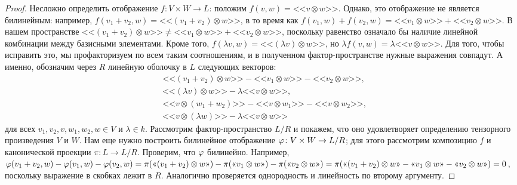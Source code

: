 \begin{proof}
Несложно определить отображение $f\colon V\times W\to L$: положим
$f(v,w) = \mbox{<<}v\otimes w\mbox{>>}$. Однако, это отображение не
является билинейным: например, $f(v_1+v_2,w) =
\mbox{<<}(v_1+v_2)\otimes w\mbox{>>}$, в то время как
$f(v_1,w) + f(v_2,w) = \mbox{<<}v_1\otimes w\mbox{>>} +
\mbox{<<}v_2\otimes w\mbox{>>}$.
В нашем пространстве $\mbox{<<}(v_1+v_2)\otimes w\mbox{>>}\neq
\mbox{<<}v_1\otimes w\mbox{>>} + 
\mbox{<<}v_2\otimes w\mbox{>>}$, поскольку равенство означало бы
наличие линейной комбинации между базисными элементами.
Кроме того,
$f(\lambda v,w) = \mbox{<<}(\lambda v)\otimes w\mbox{>>}$, но
$\lambda f(v,w) = \lambda\mbox{<<}v\otimes w\mbox{>>}$.
Для того, чтобы исправить это, мы профакторизуем по всем таким
соотношениям, и в полученном фактор-пространстве нужные выражения
совпадут.
А именно, обозначим через $R$ линейную оболочку в $L$ следующих векторов:
\begin{align*}
& \mbox{<<}(v_1+v_2)\otimes w\mbox{>>} - \mbox{<<}v_1\otimes w\mbox{>>} - 
\mbox{<<}v_2\otimes w\mbox{>>},\\
& \mbox{<<}(\lambda v)\otimes w\mbox{>>} - \lambda\mbox{<<}v\otimes w\mbox{>>},\\
& \mbox{<<}v\otimes (w_1+w_2)\mbox{>>} - \mbox{<<}v\otimes w_1\mbox{>>} -
\mbox{<<}v\otimes w_2\mbox{>>},\\
& \mbox{<<}v\otimes (\lambda w)\mbox{>>} - \lambda\mbox{<<}v\otimes w\mbox{>>}
\end{align*}
для всех $v_1,v_2,v,w_1,w_2,w\in V$ и $\lambda\in k$.
Рассмотрим фактор-пространство $L/R$ и покажем, что
оно удовлетворяет определению тензорного произведения $V$
и $W$. Нам еще нужно построить билинейное отображение
$\varphi\colon V\times W\to L/R$; для этого рассмотрим композицию $f$ и
канонической проекции $\pi\colon L\to L/R$. Проверим, что $\varphi$
билинейно. Например, $\varphi(v_1+v_2,w)-\varphi(v_1,w)-\varphi(v_2,w) = 
\pi(\mbox{<<}(v_1+v_2)\otimes w\mbox{>>}) -
\pi(\mbox{<<}v_1\otimes w\mbox{>>}) -
\pi(\mbox{<<}v_2\otimes w\mbox{>>})
= \pi(\mbox{<<}(v_1+v_2)\otimes w\mbox{>>}-
\mbox{<<}v_1\otimes w\mbox{>>} -
\mbox{<<}v_2\otimes w\mbox{>>}) = 0$, поскольку выражение в скобках
лежит в $R$. Аналогично проверяется однородность и линейность по
второму аргументу.


\end{proof}
